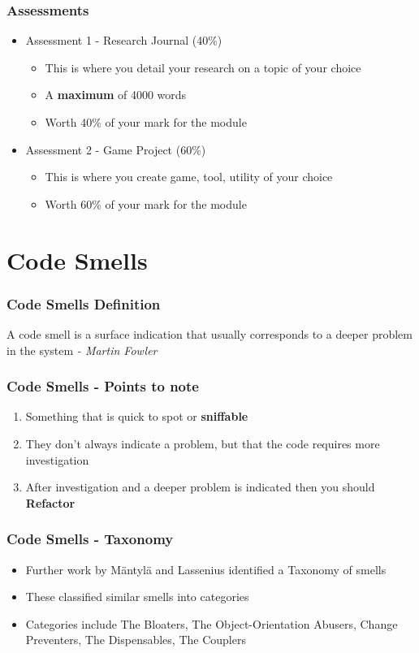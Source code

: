 \begin{frame}
	\frametitle{Assessments}
	\begin{itemize}
		\item Assessment 1 - Research Journal (40\%)
		\begin{itemize}
			\item This is where you detail your research on a topic of your choice
			\item A \textbf{maximum} of 4000 words
			\item Worth 40\% of your mark for the module
		\end{itemize}
		\item Assessment 2 - Game Project (60\%)
		\begin{itemize}
			\item This is where you create game, tool, utility of your choice
		\item Worth 60\% of your mark for the module
		\end{itemize}		
	\end{itemize}
\end{frame}

\section{Code Smells}

\begin{frame}
\frametitle{Code Smells Definition}
\begin{center}
	A code smell is a surface indication that usually corresponds to a deeper problem in the system \linebreak \linebreak 
	\small{\textit{- Martin Fowler}}
\end{center}
\end{frame}

\begin{frame}
\frametitle{Code Smells - Points to note}
\begin{enumerate}
	\item Something that is quick to spot or \textbf{sniffable}
	\item They don't always indicate a problem, but that the code requires more investigation
	\item After investigation and a deeper problem is indicated then you should \textbf{Refactor}
\end{enumerate}
\end{frame}

\begin{frame}
\frametitle{Code Smells - Taxonomy}
\begin{itemize}
	\item Further work by M{\"a}ntyl{\"a} and Lassenius identified a Taxonomy of smells
	\item These classified similar smells into categories
	\item Categories include The Bloaters, The Object-Orientation Abusers, Change Preventers, The Dispensables, The Couplers 
\end{itemize}
\end{frame}

